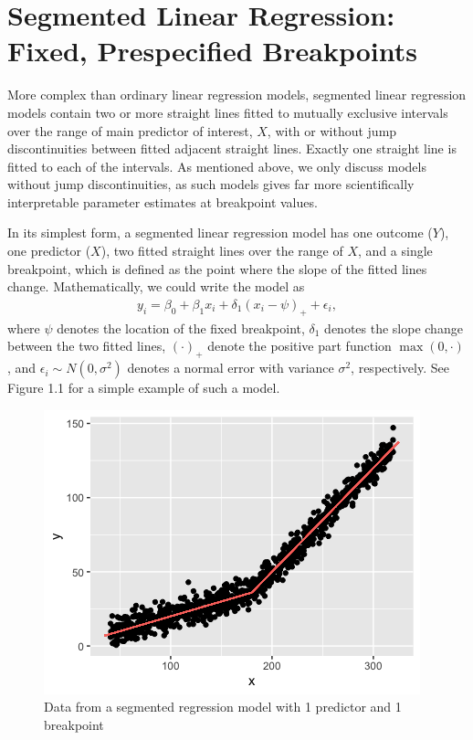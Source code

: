 \documentclass [12pt, proquest] {uwthesis}[2016/11/22]
\begin{document}
\section{Segmented Linear Regression: Fixed, Prespecified Breakpoints}

More complex than ordinary linear regression models, segmented linear regression models contain two or more straight lines fitted to mutually exclusive intervals over the range of main predictor of interest, $X$, with or without jump discontinuities between fitted adjacent straight lines. Exactly one straight line is fitted to each of the intervals. As mentioned above, we only discuss models without jump discontinuities, as such models gives far more scientifically interpretable parameter estimates at breakpoint values. 

In its simplest form, a segmented linear regression model has one outcome ($Y$), one predictor ($X$), two fitted straight lines over the range of $X$, and a single breakpoint, which is defined as the point where the slope of the fitted lines change. Mathematically, we could write the model as
\begin{align}
    y_i = \beta_0 + \beta_1 x_i + \delta_1 (x_i - \psi)_+ + \epsilon_i,
\end{align}
where $\psi$ denotes the location of the fixed breakpoint, $\delta_1$ denotes the slope change between the two fitted lines, $(\cdot)_+$ denote the positive part function $\max(0, \cdot)$, and $\epsilon_i \sim N(0, \sigma^2)$ denotes a normal error with variance $\sigma^2$, respectively. See Figure 1.1 for a simple example of such a model.

\begin{figure}
    \centering
    \includegraphics[width = 4 in]{Plot1_1.png}
    \caption{Data from a segmented regression model with 1 predictor and 1 breakpoint}
\end{figure}
\end{document}
